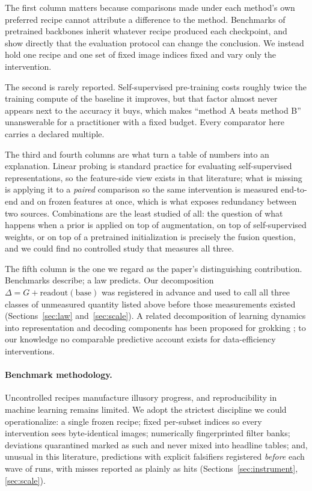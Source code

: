 The first column matters because comparisons made under each method's own
preferred recipe cannot attribute a difference to the method. Benchmarks
of pretrained backbones \citep{goldblum2023battle,marks2025closer} inherit
whatever recipe produced each checkpoint, and \citet{marks2025closer}
show directly that the evaluation protocol can change the conclusion. We
instead hold one recipe and one set of fixed image indices fixed and
vary only the intervention.

The second is rarely reported. Self-supervised pre-training costs
roughly twice the training compute of the baseline it improves, but that
factor almost never appears next to the accuracy it buys, which makes
``method A beats method B'' unanswerable for a practitioner with a fixed
budget. Every comparator here carries a declared multiple.

The third and fourth columns are what turn a table of numbers into an
explanation. Linear probing is standard practice for evaluating
self-supervised representations, so the feature-side view exists in that
literature; what is missing is applying it to a \emph{paired} comparison
so the same intervention is measured end-to-end and on frozen features at
once, which is what exposes redundancy between two sources. Combinations
are the least studied of all: the question of what happens when a prior
is applied on top of augmentation, on top of self-supervised weights, or
on top of a pretrained initialization is precisely the fusion question,
and we could find no controlled study that measures all three.

The fifth column is the one we regard as the paper's distinguishing
contribution. Benchmarks describe; a law predicts. Our decomposition
$\Delta = G + \mathrm{readout}(\mathrm{base})$ was registered in advance and
used to call all three classes of unmeasured quantity listed above before
those measurements existed (Sections~\ref{sec:law} and~\ref{sec:scale}). A related
decomposition of learning dynamics into representation and decoding components
has been proposed for grokking \citep{liu2022grokking}; to our knowledge no
comparable predictive account exists for data-efficiency interventions.

\paragraph{Benchmark methodology.}
Uncontrolled recipes manufacture illusory progress, and reproducibility in
machine learning remains limited. We adopt
the strictest discipline we could operationalize: a single frozen recipe;
fixed per-subset indices so every intervention sees byte-identical
images; numerically fingerprinted filter banks; deviations quarantined
marked as such and never mixed into headline tables; and,
unusual in this literature, predictions with explicit falsifiers
registered \emph{before} each wave of runs, with misses reported as
plainly as hits (Sections~\ref{sec:instrument}, \ref{sec:scale}).
